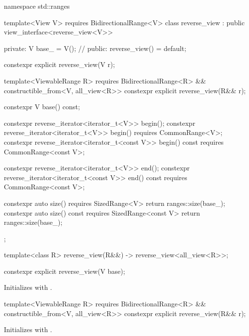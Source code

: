 %
\begin{codeblock}
namespace std::ranges {
  template<View V>
    requires BidirectionalRange<V>
  class reverse_view : public view_interface<reverse_view<V>> {
  private:
    V base_ = V();  // \expos
  public:
    reverse_view() = default;

    constexpr explicit reverse_view(V r);

    template<ViewableRange R>
      requires BidirectionalRange<R> && constructible_from<V, all_view<R>>
    constexpr explicit reverse_view(R&& r);

    constexpr V base() const;

    constexpr reverse_iterator<iterator_t<V>> begin();
    constexpr reverse_iterator<iterator_t<V>> begin() requires CommonRange<V>;
    constexpr reverse_iterator<iterator_t<const V>> begin() const
      requires CommonRange<const V>;

    constexpr reverse_iterator<iterator_t<V>> end();
    constexpr reverse_iterator<iterator_t<const V>> end() const
      requires CommonRange<const V>;

    constexpr auto size() requires SizedRange<V> {
      return ranges::size(base_);
    }
    constexpr auto size() const requires SizedRange<const V> {
      return ranges::size(base_);
    }
  };

  template<class R>
    reverse_view(R&&) -> reverse_view<all_view<R>>;
}
\end{codeblock}

%
\begin{itemdecl}
constexpr explicit reverse_view(V base);
\end{itemdecl}

\begin{itemdescr}
\pnum
\effects Initializes  with .
\end{itemdescr}

%
\begin{itemdecl}
template<ViewableRange R>
  requires BidirectionalRange<R> && constructible_from<V, all_view<R>>
constexpr explicit reverse_view(R&& r);
\end{itemdecl}

\begin{itemdescr}
\pnum
\effects Initializes  with .
\end{itemdescr}

